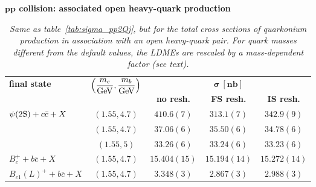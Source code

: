 

\begin{table}[t!]
\centering
\renewcommand*{\arraystretch}{1.4}
\textbf{$\boldsymbol{pp}$ collision: associated open heavy-quark production}
\begin{tabular}[t]{lcccc}
\toprule
\multirow{2}{*}{\textbf{final state}}  & \multirow{2}{*}{$\left(\dfrac{m_c}{\rm GeV}, \dfrac{m_b}{\rm GeV}\right)$}& \multicolumn{3}{c}{$\boldsymbol{\sigma}~[\textbf{nb}]$} \\
& & \textbf{no resh.} & \textbf{FS resh.} & \textbf{IS resh.} \\
\midrule
$ \psi(2\mathrm{S}) + c \bar{c} + X$ 
& $(1.55,4.7)$ & {$410.6(7)$} & {$313.1(7)$} & {$342.9(9)$} \\ \hdashline
\multirow{2}{*}{$\eta_b(2\swave) + c \bar{c} + X$} 
& $(1.55,4.7)$ & {$37.06(6)$} & {$35.50(6)$} & {$34.78(6)$} \\
& $(1.55,5)$ & {$33.26(6)$} & {$33.24(6)$} & {$33.23(6)$} \\
\hdashline
$ B_c^+ + b \bar{c} + X$ 
& $(1.55,4.7)$ & {$15.404(15)$} & {$15.194(14)$} & {$15.272(14)$} \\ 
\hdashline
$ B_{c1}(L)^+ + b \bar{c} + X$ 
& $(1.55,4.7)$ & {$3.348(3)$} & {$2.867(3)$} & {$2.988(3)$} \\ 
\bottomrule
\end{tabular}
\caption{\it\small  Same as table~\ref{tab:sigma_pp2Qj}, but for the total cross sections of quarkonium production in association with an open heavy-quark pair. For quark masses different from the default values, the LDMEs are rescaled by a mass-dependent factor (see text).}
\label{tab:sigma_pp2Qccx}
\end{table}


